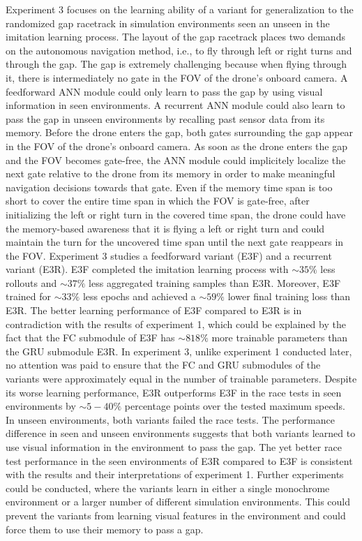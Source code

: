 Experiment 3 focuses on the learning ability of a variant
for generalization to the randomized gap racetrack in simulation environments
seen an unseen in the imitation learning process.
The layout of the gap racetrack places two demands on the autonomous navigation method,
i.e., to fly through left or right turns and through the gap.
The gap is extremely challenging because when flying through it,
there is intermediately no gate in the FOV of the drone's onboard camera.
A feedforward ANN module could only learn to 
pass the gap by using visual information in seen environments.
A recurrent ANN module could also learn to pass the gap in unseen environments
by recalling past sensor data from its memory.
Before the drone enters the gap, both gates surrounding the gap
appear in the FOV of the drone's onboard camera.
As soon as the drone enters the gap and the FOV becomes gate-free,
the ANN module could implicitely localize the next gate relative to the drone
from its memory in order to make meaningful navigation decisions towards that gate.
Even if the memory time span is too short to cover the entire time span in which the FOV is gate-free,
after initializing the left or right turn in the covered time span,
the drone could have the memory-based awareness that it is flying a left or right turn
and could maintain the turn for the uncovered time span
until the next gate reappears in the FOV.
Experiment 3 studies a feedforward variant (E3F) and a recurrent variant (E3R).
E3F completed the imitation learning process
with $\sim 35 \%$ less rollouts and $\sim 37 \%$ less aggregated training samples than E3R.
Moreover, E3F
trained for $\sim 33 \%$ less epochs and  
achieved a $\sim 59 \%$ lower final training loss than E3R.
The better learning performance of E3F compared to E3R
is in contradiction with the results of experiment 1,
which could be explained by the fact
that the FC submodule of E3F has 
$\sim 818 \%$ more trainable parameters than the GRU submodule E3R.
In experiment 3, unlike experiment 1 conducted later,
no attention was paid to ensure
that the FC and GRU submodules of the variants
were approximately equal in the number of trainable parameters.
Despite its worse learning performance,
E3R outperforms E3F in the race tests in seen environments
by $\sim 5 - 40 \%$ percentage points over the tested maximum speeds.
In unseen environments,
both variants failed the race tests.
The performance difference in seen and unseen environments
suggests that both variants learned to use visual information in the environment to pass the gap.
The yet better race test performance in the seen environments of E3R compared to E3F
is consistent with the results and their interpretations of experiment 1.
Further experiments could be conducted,
where the variants learn in 
either a single monochrome environment
or a larger number of different simulation environments.
This could prevent the variants from learning 
visual features in the environment
and could force them to use their memory to pass a gap.





